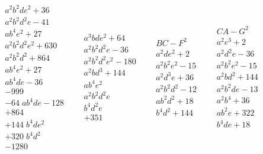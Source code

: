 \documentclass[11pt,a4paper]{article}
\theoremstyle{definition}
\begin{document}
\begin{align*}
\begin{array}{r}
a^{2}b^{2}de^{2} + 36\\
a^{2}b^{2}d^{2}e - 41\\
ab^{4}e^{2} + 27\\
a^{2}b^{2}d^{2}e^{2} + 630\\
a^{2}b^{2}d^{2} + 864\\
ab^{4}e^{2} + 27\\
ab^{4}de - 36\\
-999\\
-64\; ab^{4}de - 128\\
+864\\
+144\; b^{4}de^{2}\\
+320\; b^{4}d^{2}\\
-1280
\end{array}
&&
\begin{array}{r}
a^{3}bde^{2} + 64\\
a^{2}b^{2}d^{2}e - 36\\
a^{2}b^{2}d^{2}e^{2} - 180\\
a^{2}bd^{3} + 144\\
ab^{4}e^{2}\\
a^{2}b^{2}d^{2}e\\
b^{4}d^{2}e\\
+351
\end{array}
&&
\begin{array}{r}
BC - F^{2}\\
a^{2}de^{2} + 2\\
a^{2}b^{2}e^{2} - 15\\
a^{2}d^{3}e + 36\\
a^{2}b^{2}d^{2} - 12\\
ab^{2}d^{2} + 18\\
b^{4}d^{2} + 144
\end{array}
&&
\begin{array}{r}
CA - G^{2}\\
a^{2}e^{3} + 2\\
a^{2}d^{2}e - 36\\
a^{2}b^{2}e^{2} - 15\\
a^{2}bd^{2} + 144\\
a^{2}b^{2}de - 13\\
a^{2}b^{4} + 36\\
ab^{2}e + 322\\
b^{4}de + 18
\end{array}
\end{align*}
\end{document}
